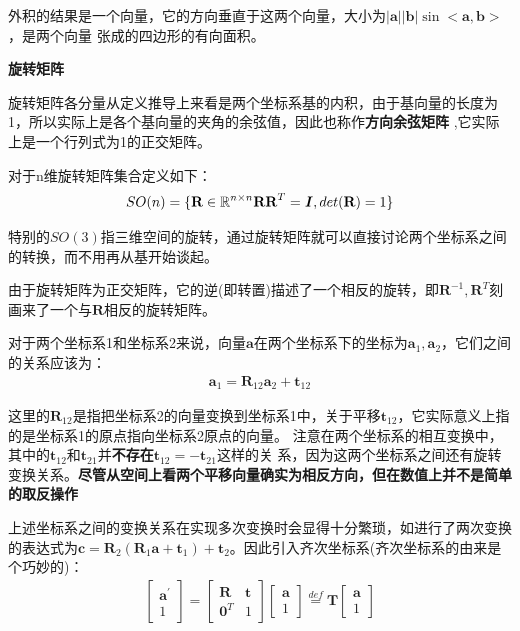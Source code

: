 \documentclass[10pt]{article}
\begin{document}
外积的结果是一个向量，它的方向垂直于这两个向量，大小为$|\textbf{a}||\textbf{b}|\sin<\textbf{a},\textbf{b}>$，是两个向量
张成的四边形的有向面积。

\textbf{旋转矩阵}

旋转矩阵各分量从定义推导上来看是两个坐标系基的内积，由于基向量的长度为1，所以实际上是各个基向量的夹角的余弦值，因此也称作\textbf{方向余弦矩阵}
,它实际上是一个行列式为1的正交矩阵。

对于n维旋转矩阵集合定义如下：
\begin{align}SO(n)=\{\textbf{R}\in \mathbb{R}^{n\times n} \textbf{R}\textbf{R}^{T}=\textbf{\emph{I}},det(\textbf{R})=1\}\end{align}

特别的$SO(3)$指三维空间的旋转，通过旋转矩阵就可以直接讨论两个坐标系之间的转换，而不用再从基开始谈起。

由于旋转矩阵为正交矩阵，它的逆(即转置)描述了一个相反的旋转，即$\textbf{R}^{-1},\textbf{R}^{T}$刻画来了一个与$\textbf{R}$相反的旋转矩阵。

对于两个坐标系1和坐标系2来说，向量$\textbf{a}$在两个坐标系下的坐标为$\textbf{a}_1,\textbf{a}_2$，它们之间的关系应该为：
\begin{align}\textbf{a}_1=\textbf{R}_{12}\textbf{a}_2+\textbf{t}_{12}\end{align}

这里的$\textbf{R}_{12}$是指把坐标系2的向量变换到坐标系1中，关于平移$\textbf{t}_{12}$，它实际意义上指的是坐标系1的原点指向坐标系2原点的向量。
注意在两个坐标系的相互变换中，其中的$\textbf{t}_{12}$和$\textbf{t}_{21}$并\textbf{不存在}$\textbf{t}_{12}=-\textbf{t}_{21}$这样的关
系，因为这两个坐标系之间还有旋转变换关系。\textbf{尽管从空间上看两个平移向量确实为相反方向，但在数值上并不是简单的取反操作}

上述坐标系之间的变换关系在实现多次变换时会显得十分繁琐，如进行了两次变换的表达式为$\textbf{c}=\textbf{R}_2(\textbf{R}_1\textbf{a}+\textbf{t}_1)
+\textbf{t}_2$。因此引入齐次坐标系(齐次坐标系的由来是个巧妙的)：
\begin{align}\left[\begin{array}{l}\textbf{a}^{'} \\ 1 \end{array}\right]=\left[\begin{array}{cc}\textbf{R}&\textbf{t} \\ \textbf{0}^{T}
    &1 \end{array}\right]\left[\begin{array}{l}\textbf{a} \\ 1 \end{array}\right] \overset{def}{=}\textbf{T}\left[\begin{array}{l}
        \textbf{a} \\ 1 \end{array}\right]\end{align}
\end{document}
